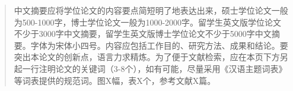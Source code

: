 \begin{abstract}
	中文摘要应将学位论文的内容要点简短明了地表达出来，硕士学位论文一般为500-1000字，博士学位论文一般为1000-2000字。留学生英文版学位论文不少于3000字中文摘要，留学生英文版博士学位论文不少于5000字中文摘要。字体为宋体小四号。内容应包括工作目的、研究方法、成果和结论。要突出本论文的创新点，语言力求精炼。为了便于文献检索，应在本页下方另起一行注明论文的关键词（3-8个），如有可能，尽量采用《汉语主题词表》等词表提供的规范词。图X幅，表X个，参考文献X篇。
		
	\noindent{}
\end{abstract}